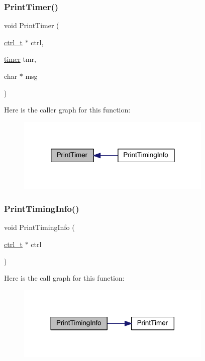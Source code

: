 \mbox{\label{a00410_aecefd5c0515e1de34636548bc2851554}} 
\subsubsection{\texorpdfstring{Print\+Timer()}{PrintTimer()}}
{\footnotesize\ttfamily void Print\+Timer (\begin{DoxyParamCaption}\item[{\hyperlink{a00742}{ctrl\+\_\+t} $\ast$}]{ctrl,  }\item[{\hyperlink{a00978_aae821c36bb7e6918e1414484f939c3d4}{timer}}]{tmr,  }\item[{char $\ast$}]{msg }\end{DoxyParamCaption})}

Here is the caller graph for this function\+:\nopagebreak
\begin{figure}[H]
\begin{center}
\leavevmode
\includegraphics[width=264pt]{a00410_aecefd5c0515e1de34636548bc2851554_icgraph}
\end{center}
\end{figure}
\mbox{\label{a00410_a113145fbd769a6debc03adaed0f0d288}} 
\subsubsection{\texorpdfstring{Print\+Timing\+Info()}{PrintTimingInfo()}}
{\footnotesize\ttfamily void Print\+Timing\+Info (\begin{DoxyParamCaption}\item[{\hyperlink{a00742}{ctrl\+\_\+t} $\ast$}]{ctrl }\end{DoxyParamCaption})}

Here is the call graph for this function\+:\nopagebreak
\begin{figure}[H]
\begin{center}
\leavevmode
\includegraphics[width=264pt]{a00410_a113145fbd769a6debc03adaed0f0d288_cgraph}
\end{center}
\end{figure}
